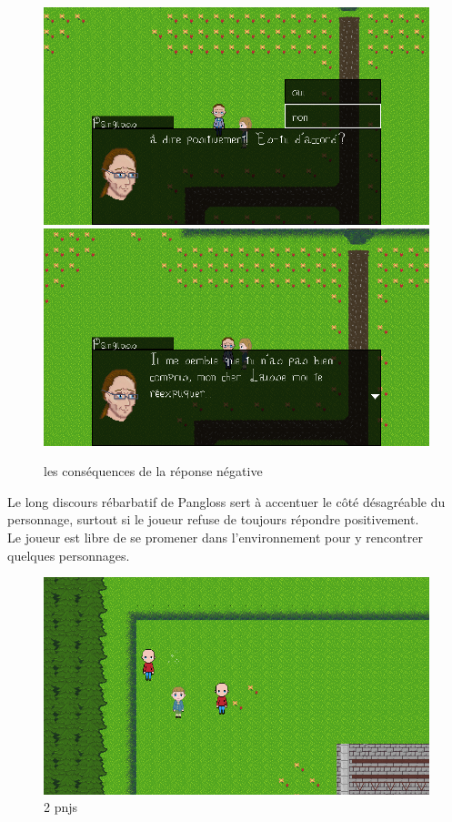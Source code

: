 \documentclass[11pt]{article}
\begin{document}
\begin{figure}[H]
\includegraphics[scale=0.35]{choix}
\includegraphics[scale=0.35]{gameplay4}
\centering
\caption{les conséquences de la réponse négative}
\label{panChoix}
\end{figure}


Le long discours rébarbatif de Pangloss sert à accentuer le côté désagréable du personnage, surtout si le joueur refuse de toujours répondre positivement. \\

Le joueur est libre de se promener dans l'environnement pour y rencontrer quelques personnages.

\begin{figure}[H]
\includegraphics[scale=0.35]{gameplay5}
\centering
\caption{2 pnjs}
\end{figure} 
\end{document}
